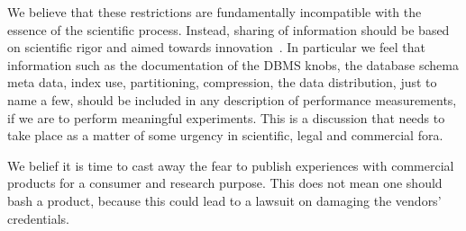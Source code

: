 \documentclass{cidr-2019}
\begin{document}
%
%

  We believe that these restrictions are fundamentally incompatible
  with the essence of the scientific process. Instead, sharing of
  information should be based on scientific rigor and aimed towards
  innovation~\cite{DBLP:conf/sigmod/RaasveldtHGM18}. In particular we
  feel that information such as the documentation of the DBMS knobs,
  the database schema meta data, index use, partitioning, compression,
  the data distribution, just to name a few, should be included in any
  description of performance measurements, if we are to perform
  meaningful experiments. This is a discussion that needs to take
  place as a matter of some urgency in scientific, legal and
  commercial fora. 

We belief it is time to cast away the fear to publish experiences with
commercial products for a consumer and research purpose.
This does not mean one should bash a product, because this could lead to a lawsuit on damaging the vendors'
credentials. 
\end{document}
